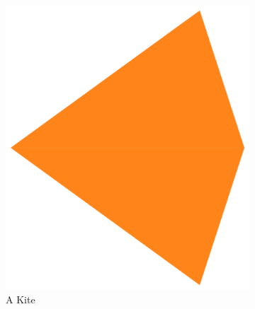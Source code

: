\documentclass[
  oneside,
  11pt, a4paper,
  footinclude=true,
  headinclude=true,
  cleardoublepage=empty
]{scrbook}
\begin{document}
\begin{figure}
\begin{subfigure}[t]{0.37\textwidth}
\includegraphics[width=\textwidth]{kite}
\caption{A Kite}
\end{subfigure}\hfill
\begin{subfigure}[t]{0.3\textwidth}

\end{subfigure}
\end{figure}
\end{document}
